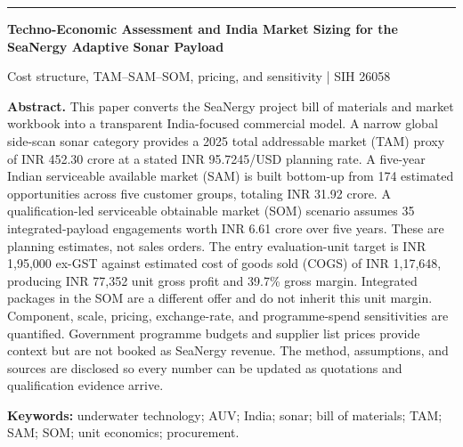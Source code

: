 \documentclass[11pt,a4paper]{article}
\begin{document}
\begin{center}
{\color{teal}\rule{\textwidth}{1.1pt}}\par\vspace{3mm}
{\fontsize{19}{22}\selectfont\bfseries Techno-Economic Assessment and India Market Sizing for the SeaNergy Adaptive Sonar Payload\par}
\vspace{2mm}
{\large Cost structure, TAM--SAM--SOM, pricing, and sensitivity | SIH 26058\par}
\vspace{3mm}{\color{teal}\rule{\textwidth}{0.4pt}}
\end{center}

\noindent\textbf{Abstract.} This paper converts the SeaNergy project bill of materials and market workbook into a transparent India-focused commercial model. A narrow global side-scan sonar category provides a 2025 total addressable market (TAM) proxy of INR 452.30 crore at a stated INR 95.7245/USD planning rate. A five-year Indian serviceable available market (SAM) is built bottom-up from 174 estimated opportunities across five customer groups, totaling INR 31.92 crore. A qualification-led serviceable obtainable market (SOM) scenario assumes 35 integrated-payload engagements worth INR 6.61 crore over five years. These are planning estimates, not sales orders. The entry evaluation-unit target is INR 1,95,000 ex-GST against estimated cost of goods sold (COGS) of INR 1,17,648, producing INR 77,352 unit gross profit and 39.7\% gross margin. Integrated packages in the SOM are a different offer and do not inherit this unit margin. Component, scale, pricing, exchange-rate, and programme-spend sensitivities are quantified. Government programme budgets and supplier list prices provide context but are not booked as SeaNergy revenue. The method, assumptions, and sources are disclosed so every number can be updated as quotations and qualification evidence arrive.\par
\noindent\textbf{Keywords:} underwater technology; AUV; India; sonar; bill of materials; TAM; SAM; SOM; unit economics; procurement.\par
\end{document}
